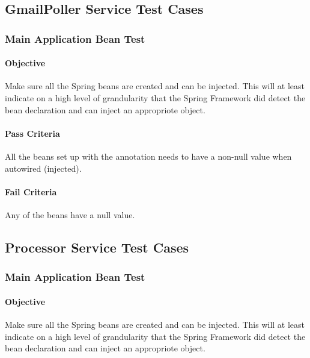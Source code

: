 \documentclass[hidelinks,english]{article}
\begin{document}
		\subsection{GmailPoller Service Test Cases}
			\subsubsection{Main Application Bean Test}\label{gmailapplicationbeanstest}
				\paragraph{Objective} Make sure all the Spring beans are created and can be injected. This will at least indicate on a high level of grandularity that the Spring Framework did detect the bean declaration and can inject an appropriote object.
				\paragraph{Pass Criteria} All the beans set up with the \emph{\@Bean} annotation needs to have a non-null value when autowired (injected).
				\paragraph{Fail Criteria} Any of the beans have a null value.
				
		\subsection{Processor Service Test Cases}
			\subsubsection{Main Application Bean Test}\label{processorapplicationbeanstest}
				\paragraph{Objective} Make sure all the Spring beans are created and can be injected. This will at least indicate on a high level of grandularity that the Spring Framework did detect the bean declaration and can inject an appropriote object.
\end{document}
